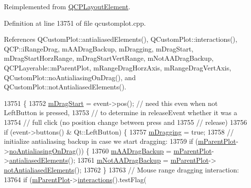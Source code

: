 Reimplemented from \hyperlink{class_q_c_p_layout_element_a2d82ea21fe0ee628f177bd824bc51a71}{Q\+C\+P\+Layout\+Element}.



Definition at line 13751 of file qcustomplot.\+cpp.



References Q\+Custom\+Plot\+::antialiased\+Elements(), Q\+Custom\+Plot\+::interactions(), Q\+C\+P\+::i\+Range\+Drag, m\+A\+A\+Drag\+Backup, m\+Dragging, m\+Drag\+Start, m\+Drag\+Start\+Horz\+Range, m\+Drag\+Start\+Vert\+Range, m\+Not\+A\+A\+Drag\+Backup, Q\+C\+P\+Layerable\+::m\+Parent\+Plot, m\+Range\+Drag\+Horz\+Axis, m\+Range\+Drag\+Vert\+Axis, Q\+Custom\+Plot\+::no\+Antialiasing\+On\+Drag(), and Q\+Custom\+Plot\+::not\+Antialiased\+Elements().


\begin{DoxyCode}
13751                                                     \{
13752   \hyperlink{class_q_c_p_axis_rect_a032896b28f83a58010d8d533b78c49df}{mDragStart} = \textcolor{keyword}{event}->pos(); \textcolor{comment}{// need this even when not LeftButton is pressed,}
13753                              \textcolor{comment}{// to determine in releaseEvent whether it was a}
13754                              \textcolor{comment}{// full click (no position change between press and}
13755                              \textcolor{comment}{// release)}
13756   \textcolor{keywordflow}{if} (event->buttons() & Qt::LeftButton) \{
13757     \hyperlink{class_q_c_p_axis_rect_ab49a6698194cf0e9e38a1d734c0888a8}{mDragging} = \textcolor{keyword}{true};
13758     \textcolor{comment}{// initialize antialiasing backup in case we start dragging:}
13759     \textcolor{keywordflow}{if} (\hyperlink{class_q_c_p_layerable_aa2a528433e44db02b8aef23c1f9f90ed}{mParentPlot}->\hyperlink{class_q_custom_plot_ae07f2895a34d13a97a10cae4d8e17a36}{noAntialiasingOnDrag}()) \{
13760       \hyperlink{class_q_c_p_axis_rect_aa4a24f76360cfebe1bcf17a77fa7521b}{mAADragBackup} = \hyperlink{class_q_c_p_layerable_aa2a528433e44db02b8aef23c1f9f90ed}{mParentPlot}->\hyperlink{class_q_custom_plot_a81e954fbb485bb44c609e5707f0067b3}{antialiasedElements}();
13761       \hyperlink{class_q_c_p_axis_rect_a6fcb12e052e276d57efbb128be31d6f5}{mNotAADragBackup} = \hyperlink{class_q_c_p_layerable_aa2a528433e44db02b8aef23c1f9f90ed}{mParentPlot}->
      \hyperlink{class_q_custom_plot_a8060cee59757213764382a78d3196189}{notAntialiasedElements}();
13762     \}
13763     \textcolor{comment}{// Mouse range dragging interaction:}
13764     \textcolor{keywordflow}{if} (\hyperlink{class_q_c_p_layerable_aa2a528433e44db02b8aef23c1f9f90ed}{mParentPlot}->\hyperlink{class_q_custom_plot_a12401c02b6949a717f5749bb28c62983}{interactions}().testFlag(

\end{DoxyCode}
